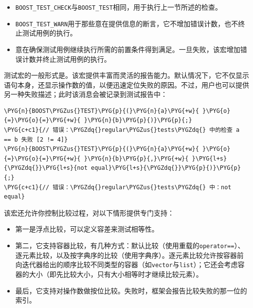 \begin{itemize}
\item \texttt{BOOST\_\allowbreak{}TEST\_\allowbreak{}CHECK}与\texttt{BOOST\_\allowbreak{}TEST}相同，用于执行上一节所述的检查。



\item \texttt{BOOST\_\allowbreak{}TEST\_\allowbreak{}WARN}用于那些意在提供信息的断言，它不增加错误计数，也不终止测试用例的执行。



\item {}意在确保测试用例继续执行所需的前置条件得到满足。一旦失败，该宏增加错误计数并终止测试用例的执行。

\end{itemize}



测试宏的一般形式是。该宏提供丰富而灵活的报告能力。默认情况下，它不仅显示语句本身，还显示操作数的值，以便迅速定位失败的原因。不过，用户也可以提供另一种失败描述；此时该消息会被记录到测试报告中：



\begin{codeblockbg}
\begin{Verbatim}[commandchars=\\\{\},breaklines=true,breakanywhere=true,fontsize=\codefont,xleftmargin=17bp]
\PYG{n}{BOOST\PYGZus{}TEST}\PYG{p}{(}\PYG{n}{a}\PYG{+w}{ }\PYG{o}{=}\PYG{o}{=}\PYG{+w}{ }\PYG{n}{b}\PYG{p}{)}\PYG{p}{;}
\PYG{c+c1}{// 错误：\PYGZdq{}regular\PYGZus{}tests\PYGZdq{} 中的检查 a == b 失败 [2 != 4]}
\PYG{n}{BOOST\PYGZus{}TEST}\PYG{p}{(}\PYG{n}{a}\PYG{+w}{ }\PYG{o}{=}\PYG{o}{=}\PYG{+w}{ }\PYG{n}{b}\PYG{p}{,}\PYG{+w}{ }\PYG{l+s}{\PYGZdq{}}\PYG{l+s}{not equal}\PYG{l+s}{\PYGZdq{}}\PYG{p}{)}\PYG{p}{;}
\PYG{c+c1}{// 错误：\PYGZdq{}regular\PYGZus{}tests\PYGZdq{} 中：not equal}
\end{Verbatim}
\end{codeblockbg}



该宏还允许你控制比较过程，对以下情形提供专门支持：



\begin{itemize}
\item 第一是浮点比较，可以定义容差来测试相等性。



\item 第二，它支持容器比较，有几种方式：默认比较（使用重载的\texttt{operator==}）、逐元素比较，以及按字典序的比较（使用字典序）。逐元素比较允许按容器前向迭代器给出的顺序比较不同类型的容器（如\texttt{vector}与\texttt{list}）；它还会考虑容器的大小（即先比较大小，只有大小相等时才继续比较元素）。



\item 最后，它支持对操作数做按位比较。失败时，框架会报告比较失败的那一位的索引。

\end{itemize}


